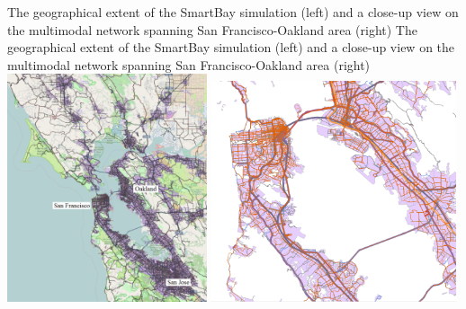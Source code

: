 \createfigure%
{The geographical extent of the SmartBay simulation (left) and a close-up view on the \gls{multimodal} network spanning San Francisco-Oakland area (right)}%
{The geographical extent of the SmartBay simulation (left) and a close-up view on the \gls{multimodal} network spanning San Francisco-Oakland area (right)}%
{\label{fig:sf1}}%
{%
 \createsubfigure%
 {}
 {\includegraphics[width=0.44\textwidth, angle=0]{./scenarios/figures/sf_fig1_left.png}}
 {\label{fig:sf_fig1_left}}
\createsubfigure%
 {}
 {\includegraphics[width=0.54\textwidth, angle=0]{./scenarios/figures/sf_fig1_right.png}}
 {\label{fig:sf_fig1_right}}
}%
{}
